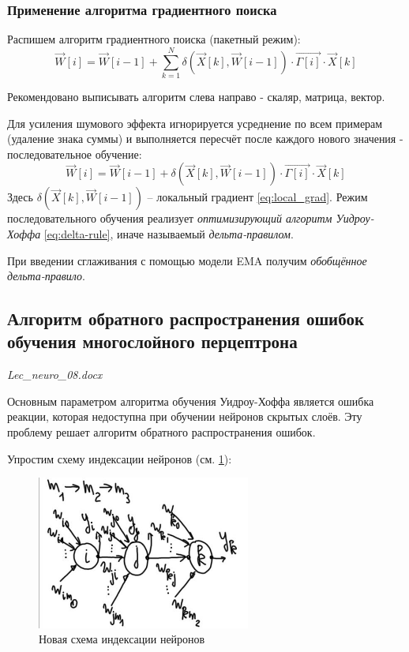 \documentclass{article}
\numberwithin{equation}{subsection}
\begin{document}
\subsubsection{Применение алгоритма градиентного поиска}

Распишем алгоритм градиентного поиска (пакетный режим):
\begin{equation}
    \vec{W}[i] = \vec{W}[i-1] + \sum_{k=1}^{N} \delta(\vec{X}[k], \vec{W}[i-1])\cdot \vec{\Gamma[i]} \cdot \vec{X}[k]
\end{equation}

\begin{myquote}
    Рекомендовано выписывать алгоритм слева направо - скаляр, матрица, вектор.
\end{myquote}

Для усиления шумового эффекта игнорируется усреднение по всем примерам (удаление знака суммы) и выполняется 
пересчёт после каждого нового значения - последовательное обучение:
\begin{equation}
    \vec{W}[i] = \vec{W}[i-1] + \delta(\vec{X}[k], \vec{W}[i-1])\cdot \vec{\Gamma[i]} \cdot \vec{X}[k]
    \label{eq:delta-rule}
\end{equation}
Здесь $\delta(\vec{X}[k], \vec{W}[i-1])$ -- локальный градиент \ref{eq:local_grad}. Режим последовательного обучения 
реализует \textit{оптимизирующий алгоритм Уидроу-Хоффа} \ref{eq:delta-rule}, 
иначе называемый \textit{дельта-правилом}.

При введении сглаживания с помощью модели EMA получим \textit{обобщённое дельта-правило}.



\subsection{Алгоритм обратного распространения ошибок обучения многослойного перцептрона}

\begin{myquote}
    \textit{Lec\_neuro\_08.docx}
\end{myquote}

Основным параметром алгоритма обучения Уидроу-Хоффа является ошибка реакции, которая 
недоступна при обучении нейронов скрытых слоёв.
Эту проблему решает алгоритм обратного распространения ошибок.

Упростим схему индексации нейронов (см. \ref{hyperflat_10_1}):

\begin{figure}[htbp]
    \centering
    \includegraphics[width=7cm]{hyperflat_10_1.jpeg}
    \caption{Новая схема индексации нейронов}
    \label{hyperflat_10_1}
\end{figure}
\end{document}

